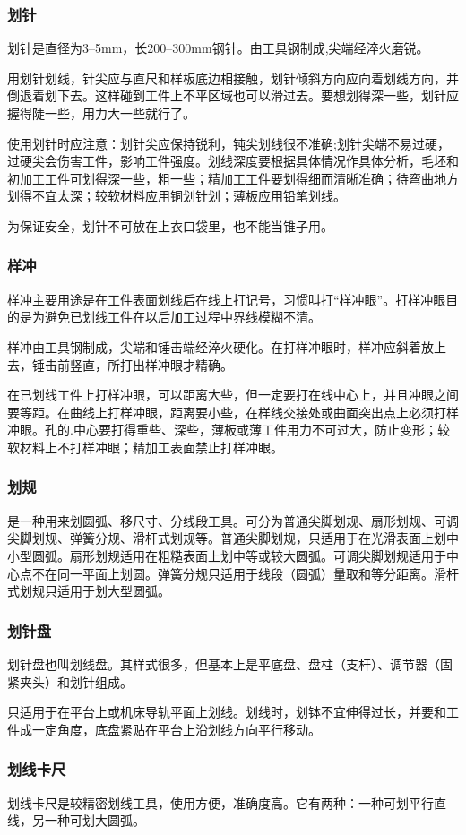 \documentclass{ctexbook}
\begin{document}
\subsubsection{划针}
划针是直径为3--5mm，长200--300mm钢针。由工具钢制成,尖端经淬火磨锐。

用划针划线，针尖应与直尺和样板底边相接触，划针倾斜方向应向着划线方向，并倒退着划下去。这样碰到工件上不平区域也可以滑过去。要想划得深一些，划针应握得陡一些，用力大一些就行了。

使用划针时应注意：划针尖应保持锐利，钝尖划线很不准确;划针尖端不易过硬，过硬尖会伤害工件，影响工件强度。划线深度要根据具体情况作具体分析，毛坯和初加工工件可划得深一些，粗一些；精加工工件要划得细而清晰准确；待弯曲地方划得不宜太深；较软材料应用铜划针划；薄板应用铅笔划线。

为保证安全，划针不可放在上衣口袋里，也不能当锥子用。
\subsubsection{样冲}
样冲主要用途是在工件表面划线后在线上打记号，习惯叫打“样冲眼”。打样冲眼目的是为避免已划线工件在以后加工过程中界线模糊不清。

样冲由工具钢制成，尖端和锤击端经淬火硬化。在打样冲眼时，样冲应斜着放上去，锤击前竖直，所打出样冲眼才精确。

在已划线工件上打样冲眼，可以距离大些，但一定要打在线中心上，并且冲眼之间要等距。在曲线上打样冲眼，距离要小些，在样线交接处或曲面突出点上必须打样冲眼。孔的.中心要打得重些、深些，薄板或薄工件用力不可过大，防止变形；较软材料上不打样冲眼；精加工表面禁止打样冲眼。
\subsubsection{划规}
是一种用来划圆弧、移尺寸、分线段工具。可分为普通尖脚划规、扇形划规、可调尖脚划规、弹簧分规、滑杆式划规等。普通尖脚划规，只适用于在光滑表面上划中小型圆弧。扇形划规适用在粗糙表面上划中等或较大圆弧。可调尖脚划规适用于中心点不在同一平面上划圆。弹簧分规只适用于线段（圆弧）量取和等分距离。滑杆式划规只适用于划大型圆弧。
\subsubsection{划针盘}
划针盘也叫划线盘。其样式很多，但基本上是平底盘、盘柱（支杆）、调节器（固紧夹头）和划针组成。

只适用于在平台上或机床导轨平面上划线。划线时，划钵不宜伸得过长，并要和工件成一定角度，底盘紧贴在平台上沿划线方向平行移动。
\subsubsection{划线卡尺}
划线卡尺是较精密划线工具，使用方便，准确度高。它有两种：一种可划平行直线，另一种可划大圆弧。
\end{document}
